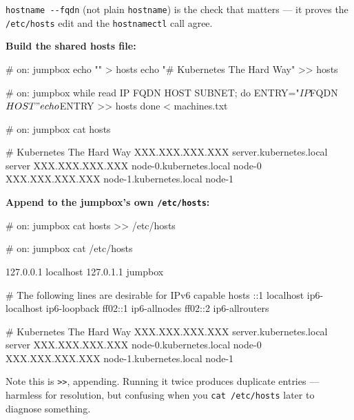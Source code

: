 \documentclass[11pt,oneside]{report}
\begin{document}
\texttt{hostname\ -\/-fqdn}
(not plain
\texttt{hostname})
is the check that
matters --- it
proves the
\texttt{/etc/hosts}
edit and the
\texttt{hostnamectl}
call agree.

\textbf{Build the
shared hosts file:}

\begin{cmdlst}
# on: jumpbox
echo "" > hosts
echo "# Kubernetes The Hard Way" >> hosts
\end{cmdlst}

\begin{cmdlst}
# on: jumpbox
while read IP FQDN HOST SUBNET; do
    ENTRY="${IP} ${FQDN} ${HOST}"
    echo $ENTRY >> hosts
done < machines.txt
\end{cmdlst}

\begin{cmdlst}
# on: jumpbox
cat hosts
\end{cmdlst}

\begin{outlst}

# Kubernetes The Hard Way
XXX.XXX.XXX.XXX server.kubernetes.local server
XXX.XXX.XXX.XXX node-0.kubernetes.local node-0
XXX.XXX.XXX.XXX node-1.kubernetes.local node-1
\end{outlst}

\textbf{Append to
the jumpbox's own
\texttt{/etc/hosts}:}

\begin{cmdlst}
# on: jumpbox
cat hosts >> /etc/hosts
\end{cmdlst}

\begin{cmdlst}
# on: jumpbox
cat /etc/hosts
\end{cmdlst}

\begin{outlst}
127.0.0.1       localhost
127.0.1.1       jumpbox

# The following lines are desirable for IPv6 capable hosts
::1     localhost ip6-localhost ip6-loopback
ff02::1 ip6-allnodes
ff02::2 ip6-allrouters

# Kubernetes The Hard Way
XXX.XXX.XXX.XXX server.kubernetes.local server
XXX.XXX.XXX.XXX node-0.kubernetes.local node-0
XXX.XXX.XXX.XXX node-1.kubernetes.local node-1
\end{outlst}

Note this is
\texttt{\textgreater{}\textgreater{}},
appending. Running
it twice produces
duplicate entries
--- harmless for
resolution, but
confusing when you
\texttt{cat\ /etc/hosts}
later to diagnose
something.
\end{document}
